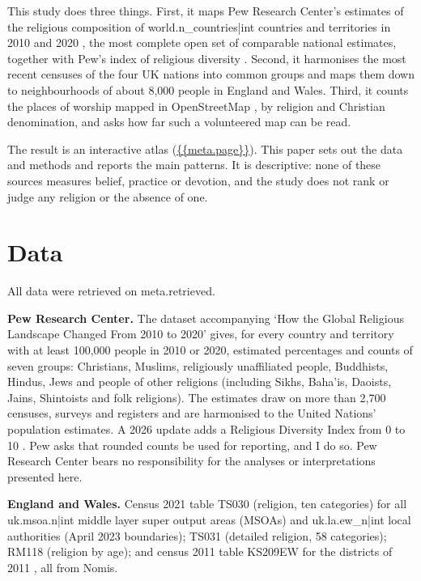 \documentclass[11pt,a4paper]{article}
\begin{document}
This study does three things. First, it maps Pew Research Center's estimates of the religious composition of {{world.n_countries|int}} countries and territories in 2010 and 2020 \citep{pew2025}, the most complete open set of comparable national estimates, together with Pew's index of religious diversity \citep{pew2026}. Second, it harmonises the most recent censuses of the four UK nations \citep{ons2021,ons2011,nrs2022,nisra2021} into common groups and maps them down to neighbourhoods of about 8,000 people in England and Wales. Third, it counts the places of worship mapped in OpenStreetMap \citep{osm}, by religion and Christian denomination, and asks how far such a volunteered map can be read.

The result is an interactive atlas (\url{{{meta.page}}}). This paper sets out the data and methods and reports the main patterns. It is descriptive: none of these sources measures belief, practice or devotion, and the study does not rank or judge any religion or the absence of one.

\section{Data}
All data were retrieved on {{meta.retrieved}}.

\textbf{Pew Research Center.} The dataset accompanying `How the Global Religious Landscape Changed From 2010 to 2020' \citep{pew2025} gives, for every country and territory with at least 100,000 people in 2010 or 2020, estimated percentages and counts of seven groups: Christians, Muslims, religiously unaffiliated people, Buddhists, Hindus, Jews and people of other religions (including Sikhs, Baha'is, Daoists, Jains, Shintoists and folk religions). The estimates draw on more than 2,700 censuses, surveys and registers and are harmonised to the United Nations' population estimates. A 2026 update adds a Religious Diversity Index from 0 to 10 \citep{pew2026}. Pew asks that rounded counts be used for reporting, and I do so. Pew Research Center bears no responsibility for the analyses or interpretations presented here.

\textbf{England and Wales.} Census 2021 table TS030 (religion, ten categories) for all {{uk.msoa.n|int}} middle layer super output areas (MSOAs) and {{uk.la.ew_n|int}} local authorities (April 2023 boundaries); TS031 (detailed religion, 58 categories); RM118 (religion by age); and census 2011 table KS209EW for the districts of 2011 \citep{ons2021,ons2011}, all from Nomis.
\end{document}
